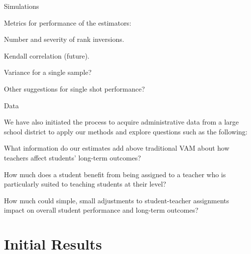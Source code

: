 \documentclass[11pt]{beamer}
\newenvironment{wideitemize}{\itemize\addtolength{\itemsep}{14pt}}{\enditemize}
\begin{document}
\begin{frame}{Simulations}

Metrics for performance of the estimators:

    \begin{wideitemize}
        \item Number and severity of rank inversions.
        \item Kendall correlation (future).
        \item Variance for a single sample?
        \item Other suggestions for single shot performance?
    \end{wideitemize}

\end{frame}



\begin{frame}{Data}

    We have also initiated the process to acquire administrative data from a large school district to apply our methods and explore questions such as the following:
    
    \begin{wideitemize}
        \item What information do our estimates add above traditional VAM about how teachers affect students' long-term outcomes?
        \item How much does a student benefit from being assigned to a teacher who is particularly suited to teaching students at their level?
        \item How much could simple, small adjustments to student-teacher assignments impact on overall student performance and long-term outcomes?
    \end{wideitemize}

\end{frame}





\section{Initial Results}

\end{document}
